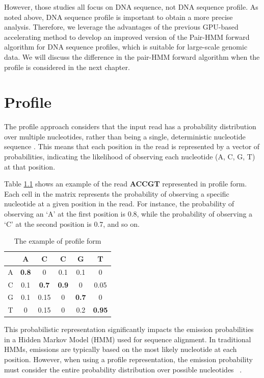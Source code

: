 \documentclass[PhD]{PHlab-thesis}
\begin{document}
However, those studies all focus on DNA sequence, not DNA sequence profile. As noted above, DNA sequence profile is important to obtain a more precise analysis. Therefore, we leverage the advantages of the previous GPU-based accelerating method to develop an improved version of the Pair-HMM forward algorithm for DNA sequence profiles, which is suitable for large-scale genomic data. We will discuss the difference in the pair-HMM forward algorithm when the profile is considered in the next chapter.

\chapter{Profile}
The profile approach considers that the input read has a probability distribution over multiple nucleotides, rather than being a single, deterministic nucleotide sequence \cite{Emad}. This means that each position in the read is represented by a vector of probabilities, indicating the likelihood of observing each nucleotide (A, C, G, T) at that position.

Table \ref{tab:profile} shows an example of the read \textbf{ACCGT} represented in profile form. Each cell in the matrix represents the probability of observing a specific nucleotide at a given position in the read. For instance, the probability of observing an `A' at the first position is 0.8, while the probability of observing a `C' at the second position is 0.7, and so on.

\begin{table}[h]
    \centering
    \begin{tabular}{c|ccccc}
         & A & C & C & G & T \\
        \hline
        A & \textbf{0.8} & 0 & 0.1 & 0.1 & 0 \\
        C & 0.1 & \textbf{0.7} & \textbf{0.9} & 0 & 0.05 \\
        G & 0.1 & 0.15 & 0 & \textbf{0.7} & 0 \\
        T & 0 & 0.15 & 0 & 0.2 & \textbf{0.95} \\
    \end{tabular}
    \caption{The example of profile form}
    \label{tab:profile}
\end{table}

This probabilistic representation significantly impacts the emission probabilities in a Hidden Markov Model (HMM) used for sequence alignment. In traditional HMMs, emissions are typically based on the most likely nucleotide at each position. However, when using a profile representation, the emission probability must consider the entire probability distribution over possible nucleotides ~\cite{Profile}.
\end{document}
